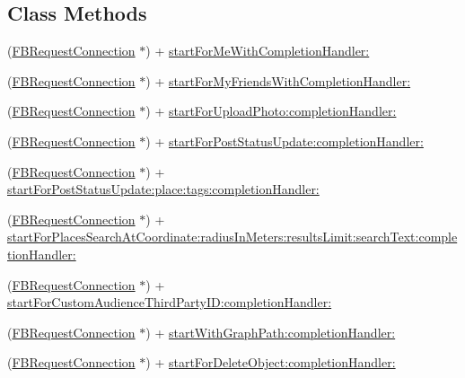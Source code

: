 \subsection*{Class Methods}
\begin{DoxyCompactItemize}
\item 
(\hyperlink{interfaceFBRequestConnection}{F\+B\+Request\+Connection} $\ast$) + \hyperlink{interfaceFBRequestConnection_a9d89090f947eacfdf441172f842f5bc8}{start\+For\+Me\+With\+Completion\+Handler\+:}
\item 
(\hyperlink{interfaceFBRequestConnection}{F\+B\+Request\+Connection} $\ast$) + \hyperlink{interfaceFBRequestConnection_a1eeb9942474312db3197be0fa569bc60}{start\+For\+My\+Friends\+With\+Completion\+Handler\+:}
\item 
(\hyperlink{interfaceFBRequestConnection}{F\+B\+Request\+Connection} $\ast$) + \hyperlink{interfaceFBRequestConnection_a824e16e083537312be6d59c8bece3f0e}{start\+For\+Upload\+Photo\+:completion\+Handler\+:}
\item 
(\hyperlink{interfaceFBRequestConnection}{F\+B\+Request\+Connection} $\ast$) + \hyperlink{interfaceFBRequestConnection_a0dee12879e90db0c29e15916375c73b0}{start\+For\+Post\+Status\+Update\+:completion\+Handler\+:}
\item 
(\hyperlink{interfaceFBRequestConnection}{F\+B\+Request\+Connection} $\ast$) + \hyperlink{interfaceFBRequestConnection_a98c2c8abc0efadda28f1c21ec0878a05}{start\+For\+Post\+Status\+Update\+:place\+:tags\+:completion\+Handler\+:}
\item 
(\hyperlink{interfaceFBRequestConnection}{F\+B\+Request\+Connection} $\ast$) + \hyperlink{interfaceFBRequestConnection_abc6f5878bcfabf0b419347a4cbfb2f68}{start\+For\+Places\+Search\+At\+Coordinate\+:radius\+In\+Meters\+:results\+Limit\+:search\+Text\+:completion\+Handler\+:}
\item 
(\hyperlink{interfaceFBRequestConnection}{F\+B\+Request\+Connection} $\ast$) + \hyperlink{interfaceFBRequestConnection_ab2ed1b7d417b4c723b37512870a5add9}{start\+For\+Custom\+Audience\+Third\+Party\+I\+D\+:completion\+Handler\+:}
\item 
(\hyperlink{interfaceFBRequestConnection}{F\+B\+Request\+Connection} $\ast$) + \hyperlink{interfaceFBRequestConnection_ad5b57e64c614dcb04a71e62ee11a87d5}{start\+With\+Graph\+Path\+:completion\+Handler\+:}
\item 
(\hyperlink{interfaceFBRequestConnection}{F\+B\+Request\+Connection} $\ast$) + \hyperlink{interfaceFBRequestConnection_a3fc3ae420d8e47fd0b7a6b915622c527}{start\+For\+Delete\+Object\+:completion\+Handler\+:}

\end{DoxyCompactItemize}
